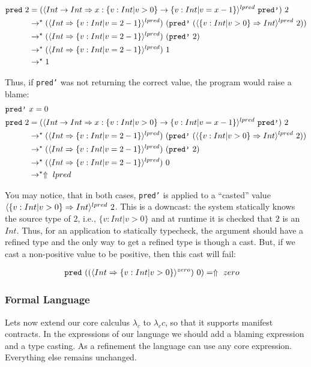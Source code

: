 \begin{align*}
\texttt{pred}\ 2 &=
(\ecast{Int \rightarrow Int}{x:\{v:Int | v > 0\} -> \{v:Int | v = x - 1\}}{lpred} \ \texttt{pred'})\ 2 \\
&\rightarrow^\star (\ecast{Int}{\{v:Int | v = 2 - 1\}}{lpred}) \ (\texttt{pred'}\ (\ecast{\{v:Int | v > 0\}}{Int}{lpred} \ 2)) \\ 
&\rightarrow^\star (\ecast{Int}{\{v:Int | v = 2 - 1\}}{lpred}) \ (\texttt{pred'}\ 2) \\ 
&\rightarrow^\star (\ecast{Int}{\{v:Int | v = 2 - 1\}}{lpred}) \ 1 \\ 
&\rightarrow^\star 1 \\ 
\end{align*}

Thus, if \texttt{pred'} was not returning the correct value, the program would raise a blame:
\begin{align*}
\texttt{pred'}\ & x= 0 \\
\texttt{pred}\ 2 &=
(\ecast{Int \rightarrow Int}{x:\{v:Int | v > 0\} -> \{v:Int | v = x - 1\}}{lpred} \ \texttt{pred'})\ 2 \\
&\rightarrow^\star (\ecast{Int}{\{v:Int | v = 2 - 1\}}{lpred}) \ (\texttt{pred'}\ (\ecast{\{v:Int | v > 0\}}{Int}{lpred} \ 2)) \\ 
&\rightarrow^\star (\ecast{Int}{\{v:Int | v = 2 - 1\}}{lpred}) \ (\texttt{pred'}\ 2) \\ 
&\rightarrow^\star (\ecast{Int}{\{v:Int | v = 2 - 1\}}{lpred}) \ 0 \\ 
&\rightarrow^\star \elabel{lpred} \\ 
\end{align*}




You may notice, that in both cases, \texttt{pred'} is applied to a ``casted'' value
$\langle \{v:Int | v > 0\} \Rightarrow Int \rangle^{lpred} \ 2$.
This is a downcast: the system statically knows the source type of $2$, i.e., 
$\{v:Int | v > 0\}$ and at runtime it is checked that $2$ is an $Int$.
Thus, for an application to statically typecheck, the argument should 
have a refined type and the only way to get a refined type is though a cast.
But, if we cast a non-positive value to be positive,
then this cast will fail:

\begin{align*}
\texttt{pred} \ ((\langle Int \Rightarrow \{v:Int | v > 0\} \rangle^{zero})\ 0) &= \Uparrow \ zero
\end{align*}


\subsubsection{Formal Language}
Lets now extend our core calculus $\lambda_c$ to $\lambda_cc$,
so that it supports manifest contracts.
%
In the expressions of our language we should add a blaming expression
and a type casting.
As a refinement the language can use any core expression.
Everything else remains unchanged.


